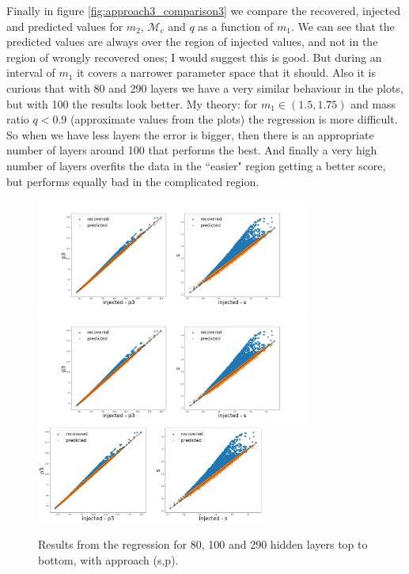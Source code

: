 \documentclass[prd,aps,twocolumn,a4paper,showkeys,nofootinbib]{article}
\begin{document}
Finally in figure \ref{fig:approach3_comparison3} we compare the recovered, injected and predicted values for $m_2$, $\mathcal{M}_c$ and $q$ as a function of $m_1$. We can see that the predicted values are always over the region of injected values, and not in the region of wrongly recovered ones; I would suggest this is good. But during an interval of $m_1$ it covers a narrower parameter space that it should. Also it is curious that with 80 and 290 layers we have a very similar behaviour in the plots, but with 100 the results look better.  My theory: for $m_1\in(1.5,1.75)$ and mass ratio $q<0.9$ (approximate values from the plots) the regression is more difficult. So when we have less layers the error is bigger, then there is an appropriate number of layers around 100 that performs the best. And finally a very high number of layers overfits the data in the ``easier" region getting a better score, but performs equally bad in the complicated region.

\begin{figure}[]
  \center
  \includegraphics[width=0.8\textwidth]{./Figs/80_resultReg}
  \includegraphics[width=0.8\textwidth]{./Figs/100_resultReg}
  \includegraphics[width=0.67\textwidth]{./Figs/290_}
  \caption{\label{fig:approach3_comparison1} Results from the regression for 80, 100 and 290 hidden layers top to bottom, with approach (s,p).}
\end{figure}
\end{document}
